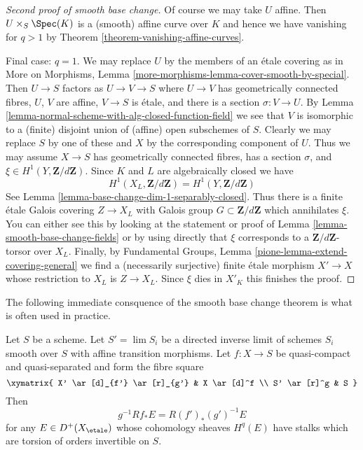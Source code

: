 \begin{proof}[Second proof of smooth base change]
\medskip\noindent
Of course we may take $U$ affine. Then $U \times_S \Spec(K)$
is a (smooth) affine curve over $K$ and hence we have vanishing
for $q > 1$ by Theorem \ref{theorem-vanishing-affine-curves}.

\medskip\noindent
Final case: $q = 1$. We may replace $U$ by the members of an
\'etale covering as in More on Morphisms, Lemma
\ref{more-morphisms-lemma-cover-smooth-by-special}.
Then $U \to S$ factors as $U \to V \to S$ where
$U \to V$ has geometrically connected fibres,
$U$, $V$ are affine, $V \to S$ is \'etale, and there is
a section $\sigma : V \to U$. By
Lemma \ref{lemma-normal-scheme-with-alg-closed-function-field}
we see that $V$ is isomorphic to a (finite) disjoint union of
(affine) open subschemes of $S$.
Clearly we may replace $S$ by one of these
and $X$ by the corresponding component of $U$.
Thus we may assume $X \to S$ has geometrically connected
fibres, has a section $\sigma$, and
$\xi \in H^1(Y, \mathbf{Z}/d\mathbf{Z})$.
Since $K$ and $L$ are algebraically closed we have
$$
H^1(X_L, \mathbf{Z}/d\mathbf{Z}) =
H^1(Y, \mathbf{Z}/d\mathbf{Z})
$$
See Lemma \ref{lemma-base-change-dim-1-separably-closed}.
Thus there is a finite \'etale Galois covering
$Z \to X_L$ with Galois group $G \subset \mathbf{Z}/d\mathbf{Z}$
which annihilates $\xi$.
You can either see this by looking at the statement or
proof of Lemma \ref{lemma-smooth-base-change-fields}
or by using directly that $\xi$ corresponds to a
$\mathbf{Z}/d\mathbf{Z}$-torsor over $X_L$.
Finally, by
Fundamental Groups, Lemma \ref{pione-lemma-extend-covering-general}
we find a (necessarily surjective)
finite \'etale morphism $X' \to X$
whose restriction to $X_L$ is $Z \to X_L$.
Since $\xi$ dies in $X'_K$ this finishes the proof.
\end{proof}

\noindent
The following immediate consquence of the smooth base change
theorem is what is often used in practice.

\begin{lemma}
\label{lemma-smooth-base-change-general}
Let $S$ be a scheme. Let $S' = \lim S_i$ be a directed inverse
limit of schemes $S_i$ smooth over $S$ with affine transition
morphisms. Let $f : X \to S$ be quasi-compact and quasi-separated
and form the fibre square
$$
\xymatrix{
X' \ar[d]_{f'} \ar[r]_{g'} & X \ar[d]^f \\
S' \ar[r]^g & S
}
$$
Then
$$
g^{-1}Rf_*E = R(f')_*(g')^{-1}E
$$
for any $E \in D^+(X_\etale)$ whose cohomology sheaves $H^q(E)$
have stalks which are torsion of orders invertible on $S$.
\end{lemma}

